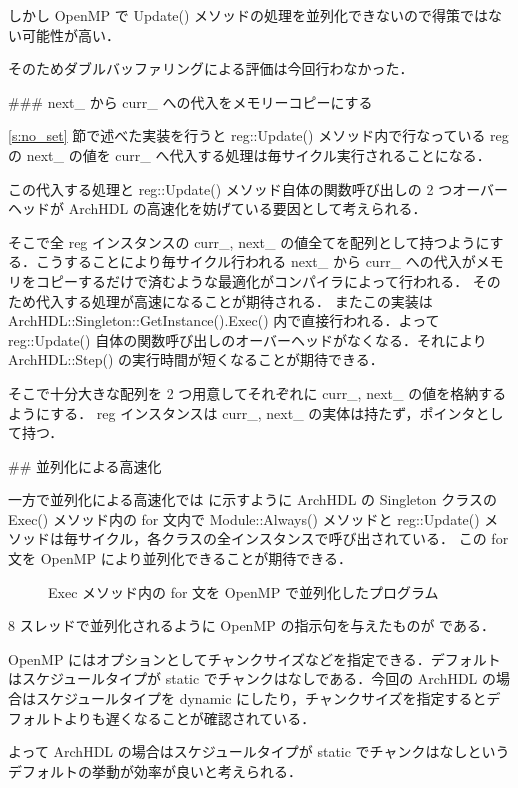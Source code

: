 しかし OpenMP で Update() メソッドの処理を並列化できないので得策ではない可能性が高い．

そのためダブルバッファリングによる評価は今回行わなかった．


### next_ から curr_ への代入をメモリーコピーにする

\ref{s:no_set} 節で述べた実装を行うと
reg::Update() メソッド内で行なっている reg の next_
の値を curr_ へ代入する処理は毎サイクル実行されることになる．

この代入する処理と reg::Update() メソッド自体の関数呼び出しの
2 つオーバーヘッドが ArchHDL の高速化を妨げている要因として考えられる．

そこで全 reg インスタンスの curr_, next_
の値全てを配列として持つようにする．こうすることにより毎サイクル行われる next_ から curr_
への代入がメモリをコピーするだけで済むような最適化がコンパイラによって行われる．
そのため代入する処理が高速になることが期待される．
またこの実装は ArchHDL::Singleton::GetInstance().Exec() 内で直接行われる．よって reg::Update() 自体の関数呼び出しのオーバーヘッドがなくなる．それにより ArchHDL::Step() の実行時間が短くなることが期待できる．

そこで十分大きな配列を 2 つ用意してそれぞれに curr_, next_ の値を格納するようにする．
reg インスタンスは curr_, next_ の実体は持たず，ポインタとして持つ．



## 並列化による高速化 \label{ss:parallel}

一方で並列化による高速化では  に示すように
ArchHDL の Singleton クラスの Exec() メソッド内の
for 文内で Module::Always() メソッドと
reg::Update() メソッドは毎サイクル，各クラスの全インスタンスで呼び出されている．
この for 文を OpenMP により並列化できることが期待できる．

\begin{figure}[t]
 
 \caption{Exec メソッド内の for 文を OpenMP で並列化したプログラム}
 \label{src:exec_openmp}
\end{figure}

8 スレッドで並列化されるように OpenMP の指示句を与えたものが  である．

OpenMP にはオプションとしてチャンクサイズなどを指定できる．デフォルトはスケジュールタイプが
static でチャンクはなしである．今回の ArchHDL の場合はスケジュールタイプを dynamic
にしたり，チャンクサイズを指定するとデフォルトよりも遅くなることが確認されている．

よって ArchHDL の場合はスケジュールタイプが static でチャンクはなしというデフォルトの挙動が効率が良いと考えられる．

